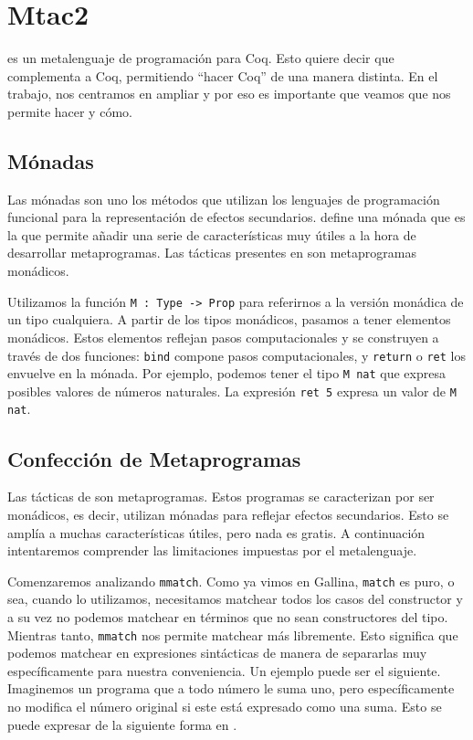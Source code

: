 \chapter{Mtac2}\label{ch:mtac2}

\Mtac \cite{DBLP:journals/pacmpl/KaiserZKRD18} es un metalenguaje de programación para Coq. Esto quiere decir que complementa a Coq, permitiendo ``hacer Coq'' de una manera distinta. En el trabajo, nos centramos en ampliar \Mtac y por eso es importante que veamos que nos permite hacer y cómo.

\section{Mónadas}

Las mónadas son uno los métodos que utilizan los lenguajes de programación funcional para la representación de efectos secundarios.
\Mtac define una mónada que es la que permite añadir una serie de características muy útiles a la hora de desarrollar metaprogramas.
Las tácticas presentes en \mtac son metaprogramas monádicos.

Utilizamos la función \lstinline{M : Type -> Prop} para referirnos a la versión monádica de un tipo cualquiera. A partir de los tipos monádicos, pasamos a tener elementos monádicos. Estos elementos reflejan pasos computacionales y se construyen a través de dos funciones: \lstinline{bind} compone pasos computacionales, y \lstinline{return} o \lstinline{ret} los envuelve en la mónada. Por ejemplo, podemos tener el tipo \lstinline{M nat} que expresa posibles valores de números naturales. La expresión \lstinline{ret 5} expresa un valor de \lstinline{M nat}.

\section{Confección de Metaprogramas}

Las tácticas de \mtac son metaprogramas.
Estos programas se caracterizan por ser monádicos, es decir, utilizan mónadas para reflejar efectos secundarios.
Esto se amplía a muchas características útiles, pero nada es gratis.
A continuación intentaremos comprender las limitaciones impuestas por el metalenguaje.

Comenzaremos analizando \lstinline{mmatch}. Como ya vimos en Gallina, \lstinline{match} es puro, o sea, cuando lo utilizamos, necesitamos matchear todos los casos del constructor y a su vez no podemos matchear en términos que no sean constructores del tipo.
Mientras tanto, \lstinline{mmatch} nos permite matchear más libremente.
Esto significa que podemos matchear en expresiones sintácticas de manera de separarlas muy específicamente para nuestra conveniencia.
Un ejemplo puede ser el siguiente.
Imaginemos un programa que a todo número le suma uno, pero específicamente no modifica el número original si este está expresado como una suma. Esto se puede expresar de la siguiente forma en \Mtac.

